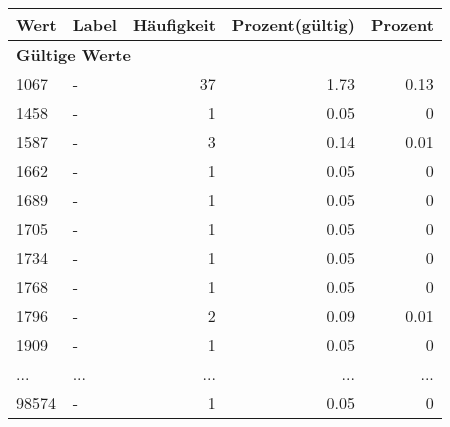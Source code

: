      \begin{longtable}{lXrrr}
     \toprule
     \textbf{Wert} & \textbf{Label} & \textbf{Häufigkeit} & \textbf{Prozent(gültig)} & \textbf{Prozent} \\
     \endhead
     \midrule
     \multicolumn{5}{l}{\textbf{Gültige Werte}}\\
        1067 & \multicolumn{1}{X}{-} & %
          \num{37} &
          \num[round-mode=places,round-precision=2]{1,73} &
          \num[round-mode=places,round-precision=2]{0,13} \\
        1458 & \multicolumn{1}{X}{-} & %
          \num{1} &
          \num[round-mode=places,round-precision=2]{0,05} &
          \num[round-mode=places,round-precision=2]{0} \\
        1587 & \multicolumn{1}{X}{-} & %
          \num{3} &
          \num[round-mode=places,round-precision=2]{0,14} &
          \num[round-mode=places,round-precision=2]{0,01} \\
        1662 & \multicolumn{1}{X}{-} & %
          \num{1} &
          \num[round-mode=places,round-precision=2]{0,05} &
          \num[round-mode=places,round-precision=2]{0} \\
        1689 & \multicolumn{1}{X}{-} & %
          \num{1} &
          \num[round-mode=places,round-precision=2]{0,05} &
          \num[round-mode=places,round-precision=2]{0} \\
        1705 & \multicolumn{1}{X}{-} & %
          \num{1} &
          \num[round-mode=places,round-precision=2]{0,05} &
          \num[round-mode=places,round-precision=2]{0} \\
        1734 & \multicolumn{1}{X}{-} & %
          \num{1} &
          \num[round-mode=places,round-precision=2]{0,05} &
          \num[round-mode=places,round-precision=2]{0} \\
        1768 & \multicolumn{1}{X}{-} & %
          \num{1} &
          \num[round-mode=places,round-precision=2]{0,05} &
          \num[round-mode=places,round-precision=2]{0} \\
        1796 & \multicolumn{1}{X}{-} & %
          \num{2} &
          \num[round-mode=places,round-precision=2]{0,09} &
          \num[round-mode=places,round-precision=2]{0,01} \\
        1909 & \multicolumn{1}{X}{-} & %
          \num{1} &
          \num[round-mode=places,round-precision=2]{0,05} &
          \num[round-mode=places,round-precision=2]{0} \\
       ... & ... & ... & ... & ... \\
        98574 & \multicolumn{1}{X}{-} & %
          \num{1} &
          \num[round-mode=places,round-precision=2]{0,05} &
          \num[round-mode=places,round-precision=2]{0} \\


\end{longtable}
